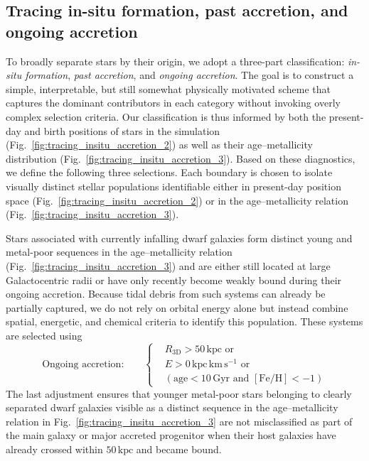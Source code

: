 \documentclass[fleqn,usenatbib]{mnras}
\newcommand{\changed}[1]{{{#1}}}
\begin{document}
\subsection{Tracing in-situ formation, past accretion, and ongoing accretion} \label{sec:analysis_broad_selection}

To broadly separate stars by their origin, we adopt a three-part classification: \textit{in-situ formation}, \textit{past accretion}, and \textit{ongoing accretion}. The goal is to construct a simple, interpretable, but still somewhat physically motivated scheme that captures the dominant contributors in each category without invoking overly complex selection criteria. Our classification is thus informed by both the present-day and birth positions of stars in the simulation (Fig.~\ref{fig:tracing_insitu_accretion_2}) as well as their age–metallicity distribution (Fig.~\ref{fig:tracing_insitu_accretion_3}). Based on these diagnostics, we define the following three selections. \changed{Each boundary is chosen to isolate visually distinct stellar populations identifiable either in present-day position space (Fig.~\ref{fig:tracing_insitu_accretion_2}) or in the age–metallicity relation (Fig.~\ref{fig:tracing_insitu_accretion_3}).}

Stars associated with \changed{currently} infalling dwarf galaxies \changed{form distinct young and metal-poor sequences in the age–metallicity relation (Fig.~\ref{fig:tracing_insitu_accretion_3}) and are either still located at large Galactocentric radii or have only recently become weakly bound during their ongoing accretion. Because tidal debris from such systems can already be partially captured, we do not rely on orbital energy alone but instead combine spatial, energetic, and chemical criteria to identify this population. These systems are selected using}
\begin{equation}
\text{Ongoing accretion:} \qquad
\begin{cases}
&R_\mathrm{3D} > 50\,\mathrm{kpc} \text{ or }\\
&E > 0\,\mathrm{kpc\,km\,s^{-1}} \text{ or } \\
&( \mathrm{age} < 10\,\mathrm{Gyr} \text{ and }  [\mathrm{Fe}/\mathrm{H}] < -1 )
\end{cases}
\end{equation}
\changed{The last adjustment ensures that younger metal-poor stars belonging to clearly separated dwarf galaxies visible as a distinct sequence in the age–metallicity relation in Fig.~\ref{fig:tracing_insitu_accretion_3} are not misclassified as part of the main galaxy or major accreted progenitor when their host galaxies have already crossed within $50\,\mathrm{kpc}$ and became bound.}
\end{document}
